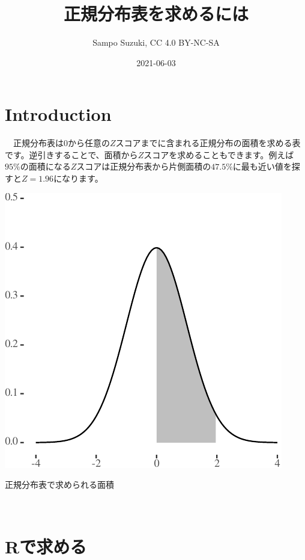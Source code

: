 \documentclass[]{tufte-handout}
\title[正規分布表を求めるには]{正規分布表を求めるには}
\author{Sampo Suzuki, CC 4.0 BY-NC-SA}
\date{2021-06-03}
\begin{document}
\maketitle




\hypertarget{introduction}{%
\section{\texorpdfstring{\textbf{Introduction}}{Introduction}}\label{introduction}}

　正規分布表は\(0\)から任意の\(Z\)スコアまでに含まれる正規分布の面積を求める表です。逆引きすることで、面積から\(Z\)スコアを求めることもできます。例えば\(95\%\)の面積になる\(Z\)スコアは正規分布表から片側面積の\(47.5\%\)に最も近い値を探すと\(Z = 1.96\)になります。

\begin{marginfigure}

{\centering \includegraphics{NormTable_files/figure-latex/unnamed-chunk-1-1} 

}

\caption[正規分布表で求められる面積]{正規分布表で求められる面積}\label{fig:unnamed-chunk-1}
\end{marginfigure}

　

\hypertarget{rux3067ux6c42ux3081ux308b}{%
\section{\texorpdfstring{\textbf{Rで求める}}{Rで求める}}\label{rux3067ux6c42ux3081ux308b}}
\end{document}
